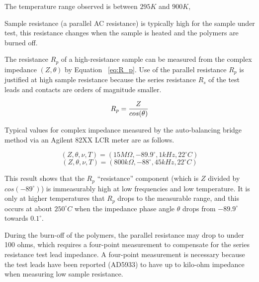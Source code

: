 \documentclass[12pt,oneside,english]{article}
\begin{document}
	The temperature range observed is between $295K$ and $900K$, 
	
	Sample resistance (a parallel AC resistance) is typically high for the sample under test, this resistance changes when the sample is heated and the polymers are burned off.  

	The resistance $R_p$ of a high-resistance sample can be measured from the complex impedance $(Z,\theta)$ by Equation ~\ref{eq:R_p}.  Use of the parallel resistance $R_p$ is justified at high sample resistance because the series resistance $R_s$ of the test leads and contacts are orders of magnitude smaller.
	
	\begin{equation}
		R_p = {{Z} \over {cos({\theta})}}
		\label{eq:R_p}
	\end{equation}
	
	Typical values for complex impedance measured by the auto-balancing bridge method via an Agilent 82XX LCR meter are as follows.
	
	\begin{equation}
		\left( Z,\theta,\nu,T \right) = \left( 15 M\Omega, -89.9^\circ, 1kHz, 22^{\circ}C \right)
	\end{equation}
	\begin{equation}
		\left( Z, \theta, \nu, T \right) = \left( 800 k\Omega, -88^\circ, 45kHz, 22^{\circ}C \right)
	\end{equation}
	
	This result shows that the $R_p$ ``resistance'' component (which is $Z$ divided by $cos(-89^\circ)$) is immeasurably high at low frequencies and low temperature.  It is only at higher temperatures that $R_p$ drops to the measurable range, and this occurs at about $250^{\circ}C$ when the impedance phase angle $\theta$ drops from $-89.9^\circ$ towards $0.1^\circ$.
	
	During the burn-off of the polymers, the parallel resistance may drop to under 100 ohms, which requires a four-point measurement to compensate for the series resistance test lead impedance.
	A four-point measurement is necessary because the test leads have been reported (AD5933) to have up to kilo-ohm impedance when measuring low sample resistance.



\clearpage


\end{document}

